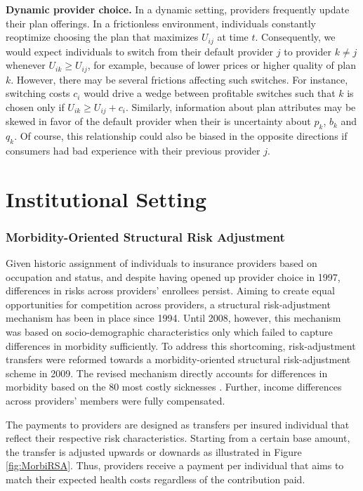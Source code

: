 \documentclass[a4paper, 11pt, english]{article}
\begin{document}
\textbf{Dynamic provider choice.} In a dynamic setting, providers frequently update their plan offerings. In a frictionless environment, individuals constantly reoptimize choosing the plan that maximizes $U_{ij}$ at time $t$. Consequently, we would expect individuals to switch from their default provider $j$ to provider $k\neq j$ whenever $U_{ik} \geq U_{ij}$, for example, because of lower prices or higher quality of plan $k$. However, there may be several frictions affecting such switches. For instance, switching costs $c_i$ would drive a wedge between profitable switches such that $k$ is chosen only if $U_{ik} \geq U_{ij} + c_i$. Similarly, information about plan attributes may be skewed in favor of the default provider when their is uncertainty about $p_k$, $b_k$ and $q_k$. Of course, this relationship could also be biased in the opposite directions if consumers had bad experience with their previous provider $j$.

\clearpage 
\newpage 
\setcounter{figure}{0}
\setcounter{table}{0}
\section{Institutional Setting \label{sec:InstitutionAppendix}}

\subsubsection*{Morbidity-Oriented Structural Risk Adjustment}

Given historic assignment of individuals to insurance providers based on occupation and status, and despite having opened up provider choice in 1997, differences in risks across providers' enrollees persist.  Aiming to create equal opportunities for competition across providers, a structural risk-adjustment mechanism has been in place since 1994. Until 2008, however, this mechanism was based on socio-demographic characteristics only which failed to capture differences in morbidity sufficiently. To address this shortcoming, risk-adjustment transfers were reformed towards a morbidity-oriented structural risk-adjustment scheme in 2009. The revised mechanism directly accounts for differences in morbidity based on the 80 most costly sicknesses \citep{kohlhammer2017}. Further, income differences across providers' members were fully compensated.

The payments to providers are designed as transfers per insured individual that reflect their respective risk characteristics. Starting from a certain base amount, the transfer is adjusted upwards or downards as illustrated in Figure \ref{fig:MorbiRSA}. Thus, providers receive a payment per individual that aims to match their expected health costs regardless of the contribution paid. 
\end{document}
